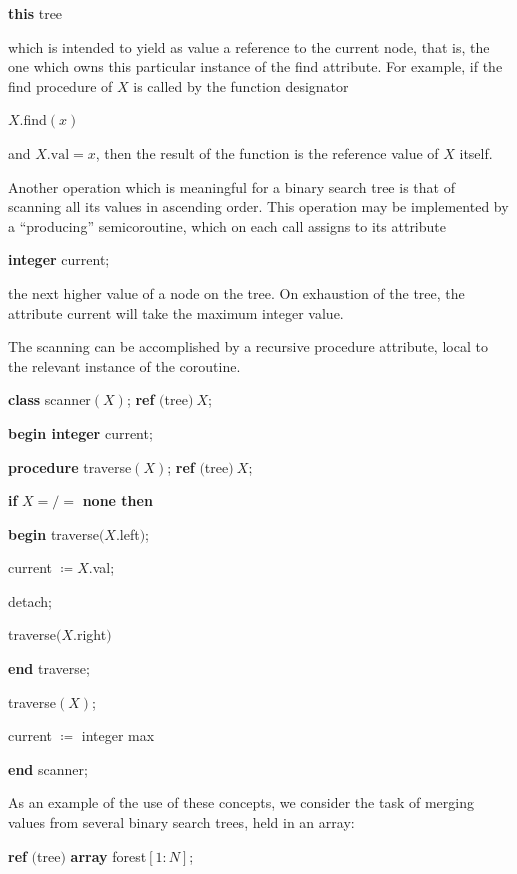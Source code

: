 \quad \textbf{this} tree

\noindent
which is intended to yield as value a reference to the current node, that is, the one which owns this particular instance of the find attribute. For example, if the find procedure of $X$ is called by the function designator 

\quad $X.$find$(x)$

\noindent
and $X.\text{val} = x$, then the result of the function is the reference value of $X$ itself.

Another operation which is meaningful for a binary search tree is that of scanning all its values in ascending order. This operation may be implemented by a ``producing'' semicoroutine, which on each call assigns to its attribute

\quad \textbf{integer} current;

\noindent
the next higher value of a node on the tree. On exhaustion of the tree, the attribute current will take the maximum integer value.

The scanning can be accomplished by a recursive procedure attribute, local to the relevant instance of the coroutine.

\quad \textbf{class} scanner$(X)$; \textbf{ref} $($tree$)\ X$;

\quad \quad \textbf{begin integer} current;

\quad \quad \quad \textbf{procedure} traverse$(X)$; \textbf{ref} $($tree$)\ X$;

\quad \quad \quad \quad \textbf{if} $X =/=$ \textbf{none then}

\quad \quad \quad \quad \quad \textbf{begin} traverse$(X$.left$)$;

\quad \quad \quad \quad \quad \quad current $\coloneq X$.val;

\quad \quad \quad \quad \quad \quad detach;

\quad \quad \quad \quad \quad \quad traverse$(X$.right$)$

\quad \quad \quad \quad \quad \textbf{end} traverse;

\quad \quad \quad traverse$(X)$;

\quad \quad \quad current $\coloneq$ integer max

\quad \quad \textbf{end} scanner;

As an example of the use of these concepts, we consider the task of merging values from several binary search trees, held in an array:

\quad \textbf{ref} $($tree$)$ \textbf{array} forest$[1: N]$;

